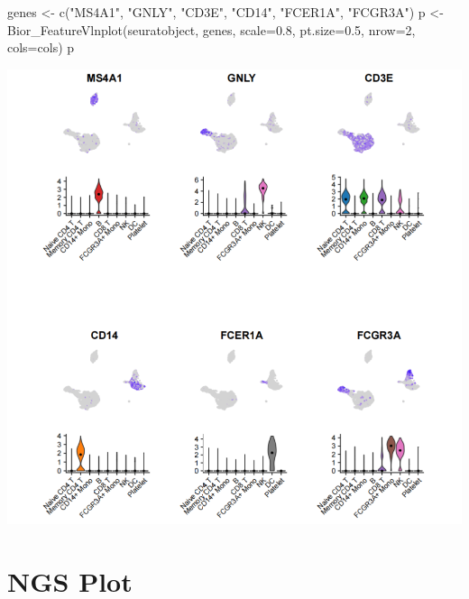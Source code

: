 \documentclass[
]{book}
\newenvironment{Shaded}{\begin{snugshade}}{\end{snugshade}}
\newcommand{\AttributeTok}[1]{\textcolor[rgb]{0.77,0.63,0.00}{#1}}
\newcommand{\DecValTok}[1]{\textcolor[rgb]{0.00,0.00,0.81}{#1}}
\newcommand{\FloatTok}[1]{\textcolor[rgb]{0.00,0.00,0.81}{#1}}
\newcommand{\FunctionTok}[1]{\textcolor[rgb]{0.00,0.00,0.00}{#1}}
\newcommand{\NormalTok}[1]{#1}
\newcommand{\OtherTok}[1]{\textcolor[rgb]{0.56,0.35,0.01}{#1}}
\newcommand{\StringTok}[1]{\textcolor[rgb]{0.31,0.60,0.02}{#1}}
\begin{document}
\begin{Shaded}
\begin{Highlighting}[]
\NormalTok{genes }\OtherTok{\textless{}{-}} \FunctionTok{c}\NormalTok{(}\StringTok{"MS4A1"}\NormalTok{, }\StringTok{"GNLY"}\NormalTok{, }\StringTok{"CD3E"}\NormalTok{, }\StringTok{"CD14"}\NormalTok{, }\StringTok{"FCER1A"}\NormalTok{, }\StringTok{"FCGR3A"}\NormalTok{)}
\NormalTok{p }\OtherTok{\textless{}{-}} \FunctionTok{Bior\_FeatureVlnplot}\NormalTok{(seuratobject, genes, }\AttributeTok{scale=}\FloatTok{0.8}\NormalTok{, }\AttributeTok{pt.size=}\FloatTok{0.5}\NormalTok{, }\AttributeTok{nrow=}\DecValTok{2}\NormalTok{, }\AttributeTok{cols=}\NormalTok{cols)}
\NormalTok{p}
\end{Highlighting}
\end{Shaded}

\includegraphics{images/Bior_FeatureVlnplot.png}

\hypertarget{ngs-plot}{%
\chapter{NGS Plot}\label{ngs-plot}}

  
\end{document}
